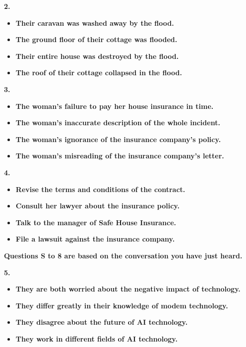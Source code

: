 \documentclass[UTF8,11pt]{ctexart}
\begin{document}
\textbf{2.}


\begin{itemize}[leftmargin=2em,itemsep=.2em,topsep=.4em]\item[A.] \textbf{Their caravan was washed away by the flood.}
\item[B.] \textbf{The ground floor of their cottage was flooded.}
\item[C.] \textbf{Their entire house was destroyed by the flood.}
\item[D.] \textbf{The roof of their cottage collapsed in the flood.}
\end{itemize}

\textbf{3.}


\begin{itemize}[leftmargin=2em,itemsep=.2em,topsep=.4em]\item[A.] \textbf{The woman's failure to pay her house insurance in time.}
\item[B.] \textbf{The woman's inaccurate description of the whole incident.}
\item[C.] \textbf{The woman's ignorance of the insurance company's policy.}
\item[D.] \textbf{The woman's misreading of the insurance company's letter.}
\end{itemize}

\textbf{4.}


\begin{itemize}[leftmargin=2em,itemsep=.2em,topsep=.4em]\item[A.] \textbf{Revise the terms and conditions of the contract.}
\item[B.] \textbf{Consult her lawyer about the insurance policy.}
\item[C.] \textbf{Talk to the manager of Safe House Insurance.}
\item[D.] \textbf{File a lawsuit against the insurance company.}
\end{itemize}

\textbf{Questions S to 8 are based on the conversation you have just heard.}


\textbf{5.}


\begin{itemize}[leftmargin=2em,itemsep=.2em,topsep=.4em]\item[A.] \textbf{They are both worried about the negative impact of technology.}
\item[B.] \textbf{They differ greatly in their knowledge of modem technology.}
\item[C.] \textbf{They disagree about the future of AI technology.}
\item[D.] \textbf{They work in different fields of AI technology.}
\end{itemize}
\end{document}
